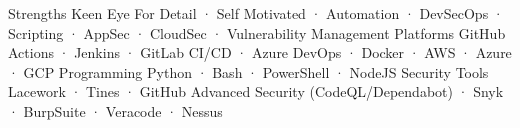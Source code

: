 


\begin{cvaboutme}
    \cvabout
        {Strengths}
        {Keen Eye For Detail · Self Motivated · Automation · DevSecOps · Scripting · AppSec · CloudSec · Vulnerability Management}
    \cvabout
        {Platforms}
        {GitHub Actions · Jenkins · GitLab CI/CD · Azure DevOps · Docker · AWS · Azure · GCP}
    \cvabout
        {Programming}
        {Python · Bash · PowerShell · NodeJS}
    \cvabout
        {Security Tools}
        {Lacework · Tines · GitHub Advanced Security (CodeQL/Dependabot) · Snyk · BurpSuite · Veracode · Nessus}
\cvsubsection{}
\end{cvaboutme}